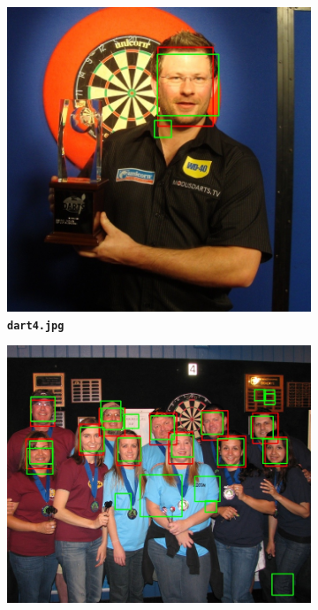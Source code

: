 \documentclass[12pt]{article}
\begin{document}
\begin{figure}[htb]
\centering
\begin{subfigure}[b]{.48\linewidth}
  \centering
  \includegraphics[width=\linewidth]{task1/result/dart4_detected.jpg}
  \caption{\textbf{\texttt{dart4.jpg}}}
\end{subfigure}
\begin{subfigure}[b]{.48\linewidth}
  \centering
  \includegraphics[width=\linewidth]{task1/result/dart5_detected.jpg}

\end{subfigure}
\end{figure}
\end{document}
